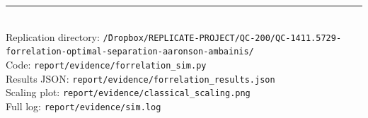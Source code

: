 \documentclass[11pt]{article}
\begin{document}
\vspace{1em}
\noindent\rule{\linewidth}{0.4pt}\\
\small
Replication directory:
\texttt{\~/Dropbox/REPLICATE-PROJECT/QC-200/QC-1411.5729-forrelation-optimal-separation-aaronson-ambainis/}\\
Code: \texttt{report/evidence/forrelation\_sim.py}\\
Results JSON: \texttt{report/evidence/forrelation\_results.json}\\
Scaling plot: \texttt{report/evidence/classical\_scaling.png}\\
Full log: \texttt{report/evidence/sim.log}\\
\end{document}
